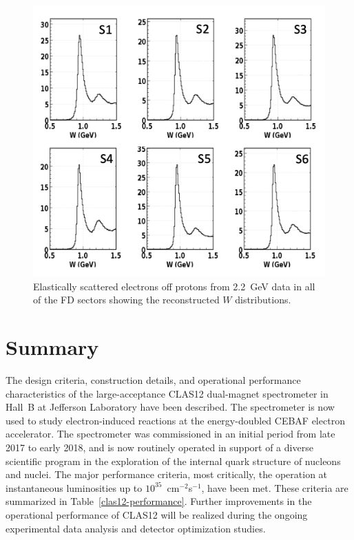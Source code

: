 \documentclass[final,3p,twocolumn]{elsarticle}
\begin{document}
\begin{figure}[t!]
\centerline{\includegraphics[width=0.9\columnwidth]{elastic-electrons.png}}
\caption{Elastically scattered electrons off protons from 2.2~GeV data in all of the FD sectors showing the
  reconstructed $W$ distributions.}
\label{elastic-electrons}
\end{figure}

\section{Summary} 

The design criteria, construction details, and operational performance characteristics of the large-acceptance
CLAS12 dual-magnet spectrometer in Hall~B at Jefferson Laboratory have been described. The spectrometer is
now used to study electron-induced reactions at the energy-doubled CEBAF electron accelerator. The spectrometer
was commissioned in an initial period from late 2017 to early 2018, and is now routinely operated in support of
a diverse scientific program in the exploration of the internal quark structure of nucleons and nuclei. The major
performance criteria, most critically, the operation at  instantaneous luminosities up to $10^{35}$~cm$^{-2}$s$^{-1}$,
have been met. These criteria are summarized in Table~\ref{clas12-performance}. Further improvements in the
operational performance of CLAS12 will be realized during the ongoing experimental data analysis and detector
optimization studies.
\end{document}
